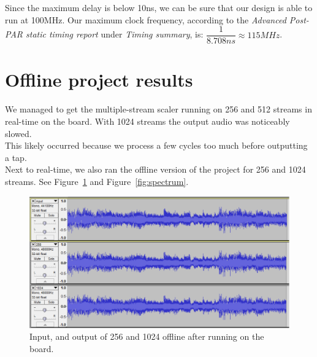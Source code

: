 \documentclass[a4paper,twoside,11pt, fleqn]{article}
\begin{document}
Since the maximum delay is below 10ns, we can be sure that our design is able to run at 100MHz. Our maximum clock frequency, according to the \textit{Advanced Post-PAR static timing report} under \textit{Timing summary}, is: $\dfrac{1}{8.708ns} \approx 115MHz$. 
   
\newpage
\section{Offline project results}
We managed to get the multiple-stream scaler running on 256 and 512 streams in real-time on the board. With 1024 streams the output audio was noticeably slowed. \\ This likely occurred because we process a few cycles too much before outputting a tap. \\

Next to real-time, we also ran the offline version of the project for 256 and 1024 streams. See Figure~\ref{fig:output} and Figure~\ref{fig:spectrum}.
\begin{figure}[h]
	\centering
	\includegraphics[scale = 0.6]{Images/output_offline.png}
    \caption{Input, and output of 256 and 1024 offline after running on the board.}
    \label{fig:output}
\end{figure}

\newpage
\end{document}
